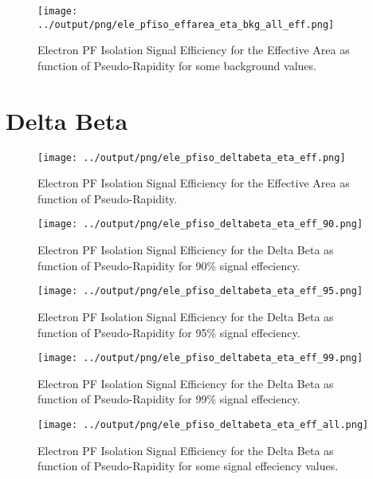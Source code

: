 \documentclass[11pt]{book}
\begin{document}
\begin{figure}[htb]
\centering
\texttt{[image: ../output/png/ele\_pfiso\_effarea\_eta\_bkg\_all\_eff.png]}
\caption{Electron PF Isolation Signal Efficiency for the Effective Area as function of Pseudo-Rapidity for some background values.}
\label{fig:ele_pfiso_eta_bkg_effarea_bkg_all_eff}
\end{figure}
\clearpage

\section{Delta Beta}
\begin{figure}[htb]
\centering
\texttt{[image: ../output/png/ele\_pfiso\_deltabeta\_eta\_eff.png]}
\caption{Electron PF Isolation Signal Efficiency for the Effective Area as function of Pseudo-Rapidity.}
\label{fig:ele_pfiso_eta_eff_deltabeta}
\end{figure}

\begin{figure}[htb]
\centering
\texttt{[image: ../output/png/ele\_pfiso\_deltabeta\_eta\_eff\_90.png]}
\caption{Electron PF Isolation Signal Efficiency for the Delta Beta as function of Pseudo-Rapidity for 90\% signal effeciency.}
\label{fig:ele_pfiso_eta_eff_deltabeta_eff_90}
\end{figure}

\begin{figure}[htb]
\centering
\texttt{[image: ../output/png/ele\_pfiso\_deltabeta\_eta\_eff\_95.png]}
\caption{Electron PF Isolation Signal Efficiency for the Delta Beta as function of Pseudo-Rapidity for 95\% signal effeciency.}
\label{fig:ele_pfiso_eta_eff_deltabeta_eff_95}
\end{figure}

\begin{figure}[htb]
\centering
\texttt{[image: ../output/png/ele\_pfiso\_deltabeta\_eta\_eff\_99.png]}
\caption{Electron PF Isolation Signal Efficiency for the Delta Beta as function of Pseudo-Rapidity for 99\% signal effeciency.}
\label{fig:ele_pfiso_eta_eff_deltabeta_eff_99}
\end{figure}

\begin{figure}[htb]
\centering
\texttt{[image: ../output/png/ele\_pfiso\_deltabeta\_eta\_eff\_all.png]}
\caption{Electron PF Isolation Signal Efficiency for the Delta Beta as function of Pseudo-Rapidity for some signal effeciency values.}
\label{fig:ele_pfiso_eta_eff_deltabeta_eff_all}
\end{figure}
\end{document}

